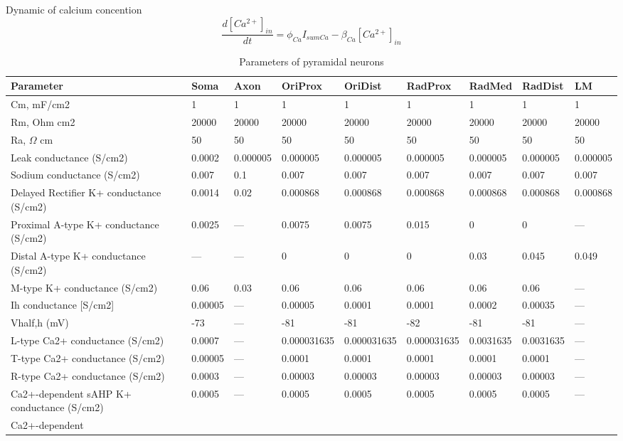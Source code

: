 \documentclass[12pt]{article}
\begin{document}
Dynamic of calcium concention
\begin{equation}
\frac{d[Ca^{2+}]_{in}}{dt} = \phi_{Ca} I_{sumCa} - \beta_{Ca} [Ca^{2+}]_{in}
\end{equation}
\newline
\begin{table}[h]
	\caption{ Parameters of pyramidal neurons  }
	\begin{center}
		\begin{tabular}{ |p{2cm} | p{1.25cm} |p{1.25cm} |p{1.25cm} |p{1.25cm} |p{1.25cm} |p{1.25cm} |p{1.25cm} |p{1.25cm} | }
			\hline
			\textbf{Parameter} & \textbf{Soma} & \textbf{Axon} & \textbf{OriProx} & \textbf{OriDist} & \textbf{RadProx} & \textbf{RadMed} & \textbf{RadDist} & \textbf{LM} \\ \hline
			Cm, mF/cm2 & 1 & 1 & 1 & 1 & 1 & 1 & 1 & 1 \\ \hline Rm, Ohm cm2 & 20000 & 20000 & 20000 & 20000 & 20000 & 20000 & 20000 & 20000 \\ \hline  Ra, $\Omega$ cm & 50 & 50 & 50 & 50 & 50 & 50 & 50 & 50 \\ \hline Leak conductance (S/cm2) & 0.0002 & 0.000005 & 0.000005 & 0.000005 & 0.000005 & 0.000005 & 0.000005 & 0.000005 \\ \hline  Sodium conductance (S/cm2) & 0.007 & 0.1 & 0.007 & 0.007 & 0.007 & 0.007 & 0.007 & 0.007 \\ \hline  Delayed Rectifier K+ conductance (S/cm2) & 0.0014 & 0.02 & 0.000868 & 0.000868 & 0.000868 & 0.000868 & 0.000868 & 0.000868 \\ \hline  Proximal A-type K+ conductance (S/cm2) & 0.0025 & --- & 0.0075 & 0.0075 & 0.015 & 0 & 0 & --- \\ \hline  Distal A-type K+ conductance (S/cm2) & --- & --- & 0 & 0 & 0 & 0.03 & 0.045 & 0.049 \\ \hline  M-type K+ conductance (S/cm2) & 0.06 & 0.03 & 0.06 & 0.06 & 0.06 & 0.06 & 0.06 & --- \\ \hline  Ih conductance [S/cm2] & 0.00005 & --- & 0.00005 & 0.0001 & 0.0001 &  0.0002 & 0.00035 & --- \\ \hline  Vhalf,h (mV) & -73 & --- & -81 & -81 & -82 & -81 & -81 & --- \\ \hline  L-type Ca2+ conductance (S/cm2) & 0.0007 & --- & 0.000031635 & 0.000031635 & 0.000031635 & 0.0031635 & 0.0031635 & --- \\ \hline  T-type Ca2+ conductance (S/cm2) & 0.00005 & --- & 0.0001 & 0.0001 & 0.0001 & 0.0001 & 0.0001 & --- \\ \hline  R-type Ca2+ conductance (S/cm2) & 0.0003 & --- & 0.00003 & 0.00003 & 0.00003 & 0.00003 & 0.00003 & --- \\ \hline  Ca2+-dependent sAHP  K+ conductance (S/cm2) & 0.0005 & --- & 0.0005 & 0.0005 & 0.0005 & 0.0005 & 0.0005 & --- \\ \hline  Ca2+-dependent 
\end{tabular}
\end{center}
\end{table}
\end{document}
